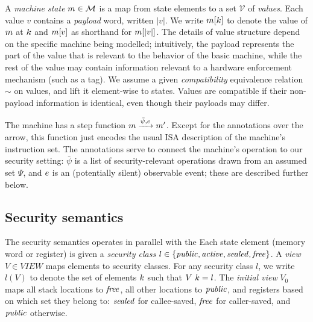 \documentclass[10pt,conference]{ieeetran}%
\theoremstyle{definition}
\begin{document}
A {\em machine state} \(m \in {\mathcal M}\) is a map from state elements to a set \(\mathcal{V}\) of
\emph{values}.
Each value \(v\) contains a \emph{payload} word, written \(|v|\).
We write \(m[k]\) to denote the value of \(m\) at
\(k\)  and \(m[v]\) as shorthand for \(m[|v|]\).
The details of value structure depend on the specific machine being modelled;
intuitively, the payload represents the part of the value that is relevant to
the behavior of the basic machine, while the rest of the value may contain
information relevant to a hardware enforcement mechanism (such as a tag).
We assume a given \emph{compatibility} equivalence relation \(\sim\) on values,
and lift it element-wise to states.
Values are compatible if their non-payload information is identical, 
even though their payloads may differ.

The machine has a step function \(m \xrightarrow{\bar{\psi},e} m'\).
Except for the annotations over the arrow, this function just encodes the usual
ISA description of the machine's instruction set. The annotations serve to connect
the machine's operation to our security setting: 
\(\bar{\psi}\) is a list of security-relevant operations drawn from an assumed set \(\Psi\),
and \(e\) is an (potentially silent) observable event; these are described further below.

\subsection{Security semantics}

The security semantics operates in parallel with the 
Each state element (memory word or register) is given a \emph{security class} 
\(l \in \{\mathit{public}, \mathit{active}, \mathit{sealed}, \mathit{free}\}\).
A \emph{view} \(V \in \mathit{VIEW}\) maps elements to security classes.
For any security class \(l\), we write \(l(V)\)
to denote the set of elements \(k\) such that \(V ~ k = l\).
The {\it initial view} \(V_0\) maps all stack locations to \(\mathit{free}\),
all other locations to \(\mathit{public}\), and registers based on which set they
belong to: \(\mathit{sealed}\) for callee-saved, \(\mathit{free}\) for caller-saved, and \(\mathit{public}\) otherwise.
\end{document}
